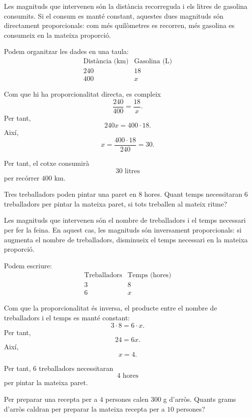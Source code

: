 \begin{solucio}
Les magnituds que intervenen són la distància recorreguda i els litres de gasolina consumits. Si el consum es manté constant, aquestes dues magnituds són directament proporcionals: com més quilòmetres es recorren, més gasolina es consumeix en la mateixa proporció.

Podem organitzar les dades en una taula:
\[
\begin{array}{c|c}
\text{Distància (km)} & \text{Gasolina (L)}\\
\hline
240 & 18\\
400 & x
\end{array}
\]

Com que hi ha proporcionalitat directa, es compleix
\[
	\frac{240}{400}=\frac{18}{x}.
\]
Per tant,
\[
	240x=400\cdot 18.
\]
Així,
\[
	x=\frac{400\cdot 18}{240}=30.
\]

Per tant, el cotxe consumirà
\[
	30\text{ litres}
\]
per recórrer \(400\) km.
\end{solucio}

\begin{exemple}
Tres treballadors poden pintar una paret en \(8\) hores. Quant temps necessitaran \(6\) treballadors per pintar la mateixa paret, si tots treballen al mateix ritme?
\end{exemple}

\begin{solucio}
Les magnituds que intervenen són el nombre de treballadors i el temps necessari per fer la feina. En aquest cas, les magnituds són inversament proporcionals: si augmenta el nombre de treballadors, disminueix el temps necessari en la mateixa proporció.

Podem escriure:
\[
\begin{array}{c|c}
\text{Treballadors} & \text{Temps (hores)}\\
\hline
3 & 8\\
6 & x
\end{array}
\]

Com que la proporcionalitat és inversa, el producte entre el nombre de treballadors i el temps es manté constant:
\[
	3\cdot 8=6\cdot x.
\]
Per tant,
\[
	24=6x.
\]
Així,
\[
	x=4.
\]

Per tant, \(6\) treballadors necessitaran
\[
	4\text{ hores}
\]
per pintar la mateixa paret.
\end{solucio}

\begin{exemple}
Per preparar una recepta per a \(4\) persones calen \(300\) g d'arròs. Quants grams d'arròs caldran per preparar la mateixa recepta per a \(10\) persones?
\end{exemple}

